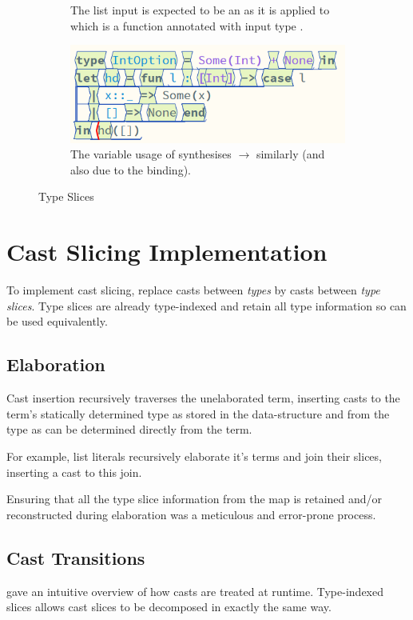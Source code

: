 \begin{figure}[h]
\begin{subfigure}[t]{0.45\textwidth}
\caption{The list input is expected to be an \code{[Int]} as it is applied to  which is a function annotated with input type \code{[Int]}.}
\end{subfigure}
\begin{subfigure}[t]{0.45\textwidth}
\centering
\includegraphics[width=1\textwidth]{Media/Figures/hd_syn}
\caption{The variable usage of  synthesises \code{[Int]}$\to$  similarly (and also due to the binding).}
\end{subfigure}
\caption{Type Slices}
\label{fig:SliceExamples}
\end{figure}

\section{Cast Slicing Implementation}\label{sec:CastSlicingImplementation}
To implement cast slicing, replace casts between \textit{types} by casts between \textit{type slices}. Type slices are already type-indexed and retain all type information so can be used equivalently.

\subsection{Elaboration}\label{sec:Elaboration}
Cast insertion recursively traverses the unelaborated term, inserting casts to the term's statically determined type as stored in the  data-structure and from the type as can be determined directly from the term. 

For example, list literals recursively elaborate it's terms and join their slices, inserting a cast to this join.

Ensuring that all the type slice information from the  map is retained and/or reconstructed during elaboration was a meticulous and error-prone process.

\subsection{Cast Transitions}
 gave an intuitive overview of how casts are treated at runtime. Type-indexed slices allows cast slices to be decomposed in exactly the same way. 

